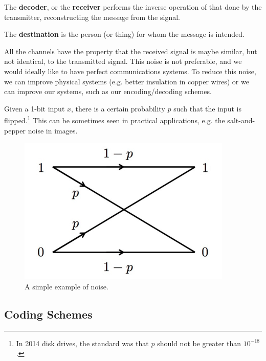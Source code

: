 \documentclass{article}
\begin{document}
    \begin{definition}[Decoder]
      The \textbf{decoder}, or the \textbf{receiver} performs the inverse operation of that done by the transmitter, reconstructing the message from the signal. 
    \end{definition}

    \begin{definition}[Destination]
      The \textbf{destination} is the person (or thing) for whom the message is intended.  
    \end{definition}

    All the channels have the property that the received signal is maybe similar, but not identical, to the transmitted signal. This noise is not preferable, and we would ideally like to have perfect communications systems. To reduce this noise, we can improve physical systems (e.g. better insulation in copper wires) or we can improve our systems, such as our encoding/decoding schemes. 

    \begin{example}
      Given a 1-bit input $x$, there is a certain probability $p$ such that the input is flipped.\footnote{In 2014 disk drives, the standard was that $p$ should not be greater than $10^{-18}$.} This can be sometimes seen in practical applications, e.g. the salt-and-pepper noise in images. 
      \begin{figure}[H]
        \centering 
        \includegraphics[scale=0.4]{img/binary_symm_channel.png}
        \caption{A simple example of noise. } 
        \label{fig:binary_symm_channel}
      \end{figure}
    \end{example}

  \subsection{Coding Schemes}
\end{document}
